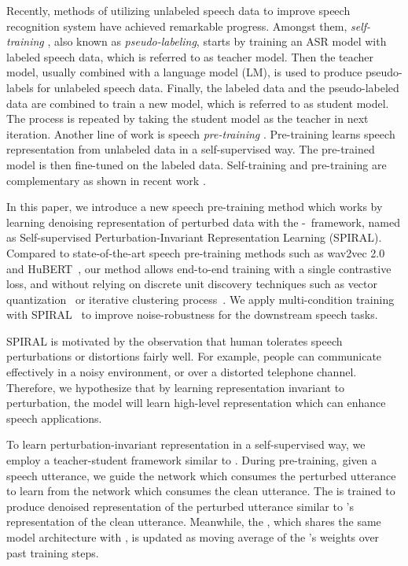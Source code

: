 Recently, methods of utilizing unlabeled speech data to improve speech recognition system have achieved remarkable progress.
Amongst them, \textit{self-training} \citep{manohar15_interspeech,Kahn2020,synnaeve2020end,chen20m_interspeech,xu20b_interspeech,park2020improved, Xiao2021contrative}, also known as \textit{pseudo-labeling}, starts by training an ASR model with labeled speech data, which is referred to as teacher model. Then the teacher model, usually combined with a language model (LM), is used to produce pseudo-labels for unlabeled speech data. Finally, the labeled data and the pseudo-labeled data are combined to train a new model, which is referred to as student model. The process is repeated by taking the student model as the teacher in next iteration. Another line of work is speech \textit{pre-training} \citep{oord2019representation, Chung2020, Wang2020, wav2vec2, Liu2020}. Pre-training learns speech representation from unlabeled data in a self-supervised way. The pre-trained model is then fine-tuned on the labeled data. Self-training and pre-training are complementary as shown in recent work \citep{Xu2021,zhang2020pushing}.

In this paper, we introduce a new speech pre-training method which works by learning denoising representation of perturbed data with the \teacher-\student\ framework, named as Self-supervised Perturbation-Invariant Representation Learning (SPIRAL).
Compared to state-of-the-art speech pre-training methods such as wav2vec 2.0~\citep{wav2vec2} and HuBERT~\citep{hubert}, our method allows end-to-end training with a single contrastive loss, and without relying on discrete unit discovery techniques such as vector quantization~\citep{Jegou2011,baevski2020vqwav2vec,wav2vec2} or iterative clustering process~\citep{hubert}.
We apply multi-condition training with SPIRAL~\citep{Seltzer2013,ko15_interspeech} to improve noise-robustness for the downstream speech tasks. 

SPIRAL is motivated by the observation that human tolerates speech perturbations or distortions fairly well. For example, people can communicate effectively in a noisy environment, or over a distorted telephone channel.
Therefore, we hypothesize that by learning representation invariant to perturbation, the model will learn high-level representation which can enhance speech applications.

To learn perturbation-invariant representation in a self-supervised way, we employ a teacher-student framework similar to \citet{Tarvainen2017}.
During pre-training, given a speech utterance, we guide the \student{} network which consumes the perturbed utterance to learn from the \teacher{} network which consumes the clean utterance.
The \student{} is trained to produce denoised representation of the perturbed utterance similar to \teacher{}'s representation of the clean utterance.
Meanwhile, the \teacher{}, which shares the same model architecture with \student{}, is updated as moving average of the \student{}'s weights over past training steps.

